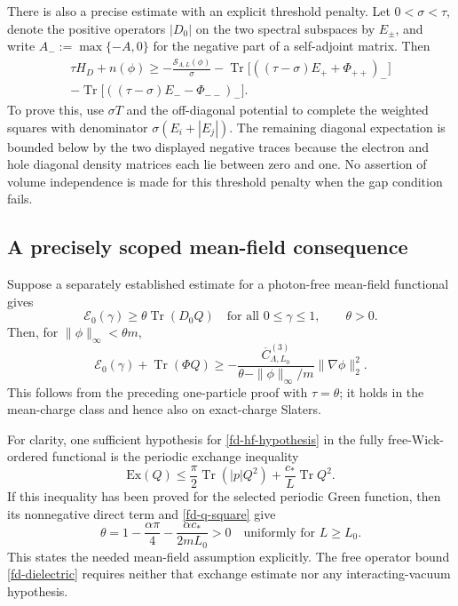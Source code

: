 There is also a precise estimate with an explicit threshold penalty.
Let $0<\sigma<\tau$, denote the positive operators $|D_0|$ on the two
spectral subspaces by $E_\pm$, and write $A_-:=\max\{-A,0\}$ for the
negative part of a self-adjoint matrix.  Then
\begin{multline}
 \tau H_D+n(\phi)\ge
 -\frac{\mathcal S_{\Lambda,L}(\phi)}{\sigma}
 -\operatorname{Tr}\bigl[((\tau-\sigma)E_++\Phi_{++})_-\bigr]\\
 -\operatorname{Tr}\bigl[((\tau-\sigma)E_- -\Phi_{--})_-\bigr].
 \label{fd-threshold}
\end{multline}
To prove this, use $\sigma T$ and the off-diagonal potential to complete
the weighted squares with denominator $\sigma(E_i+|E_j|)$.
The remaining diagonal expectation is bounded below by the two displayed
negative traces because the electron and hole diagonal density matrices
each lie between zero and one.  No assertion of volume independence is
made for this threshold penalty when the gap condition fails.

\subsection{A precisely scoped mean-field consequence}

Suppose a separately established estimate for a photon-free mean-field
functional gives
\begin{equation}
 \mathcal E_0(\gamma)\ge\theta\operatorname{Tr}(D_0Q)
 \quad\text{for all }0\le\gamma\le1,
 \qquad\theta>0.
 \label{fd-hf-hypothesis}
\end{equation}
Then, for $\|\phi\|_\infty<\theta m$,
\begin{equation}
 \mathcal E_0(\gamma)+\operatorname{Tr}(\Phi Q)
 \ge-\frac{\overline C^{(3)}_{\Lambda,L_0}}
                 {\theta-\|\phi\|_\infty/m}
       \|\nabla\phi\|_2^2.
 \label{fd-hf-dielectric}
\end{equation}
This follows from the preceding one-particle proof with $\tau=\theta$;
it holds in the mean-charge class and hence also on exact-charge Slaters.

For clarity, one sufficient hypothesis for \eqref{fd-hf-hypothesis} in
the fully free-Wick-ordered functional is the periodic exchange inequality
\[
 \mathrm{Ex}(Q)\le\frac\pi2\operatorname{Tr}(|p|Q^2)
                      +\frac{c_*}{L}\operatorname{Tr}Q^2.
\]
If this inequality has been proved for the selected periodic Green function,
then its nonnegative direct term and \eqref{fd-q-square} give
\[
 \theta=1-\frac{\alpha\pi}{4}-\frac{\alpha c_*}{2mL_0}>0
 \quad\text{uniformly for }L\ge L_0.
\]
This states the needed mean-field assumption explicitly.  The free operator
bound \eqref{fd-dielectric} requires neither that exchange estimate nor
any interacting-vacuum hypothesis.
